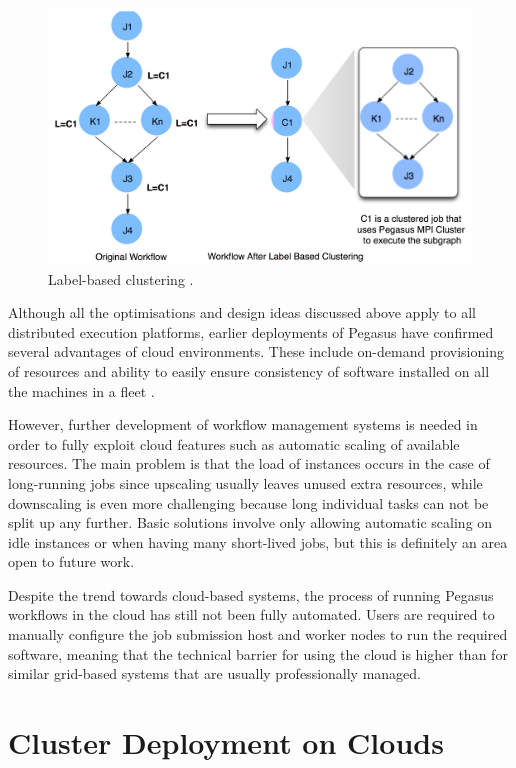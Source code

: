 \documentclass[11pt,a4paper]{report}
\begin{document}
\vspace{6mm}
\begin{figure}[h]
	\centering
		\includegraphics[scale=0.23]{figures/LabelClustering.png}
	\caption{Label-based clustering \cite{Deelman2013}.}
	\label{LabelClustering}
\end{figure}

Although all the optimisations and design ideas discussed above apply to all distributed execution platforms, earlier deployments of Pegasus have confirmed several advantages of cloud environments. These include on-demand provisioning of resources and ability to easily ensure consistency of software installed on all the machines in a fleet \cite{Deelman2016}. 

However, further development of workflow management systems is needed in order to fully exploit cloud features such as automatic scaling of available resources. The main problem is that the load of instances occurs in the case of long-running jobs since upscaling usually leaves unused extra resources, while downscaling is even more challenging because long individual tasks can not be split up any further. Basic solutions involve only allowing automatic scaling on idle instances or when having many short-lived jobs, but this is definitely an area open to future work.

Despite the trend towards cloud-based systems, the process of running Pegasus workflows in the cloud has still not been fully automated. Users are required to manually configure the job submission host and worker nodes to run the required software, meaning that the technical barrier for using the cloud is higher than for similar grid-based systems that are usually professionally managed.

\section{Cluster Deployment on Clouds}
\end{document}
